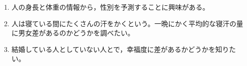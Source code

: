 \begin{enumerate}
	\item 人の身長と体重の情報から，性別を予測することに興味がある。
	\item 人は寝ている間にたくさんの汗をかくという。一晩にかく平均的な寝汗の量に男女差があるのかどうかを調べたい。
	\item 結婚している人としていない人とで，幸福度に差があるかどうかを知りたい。
\end{enumerate}
